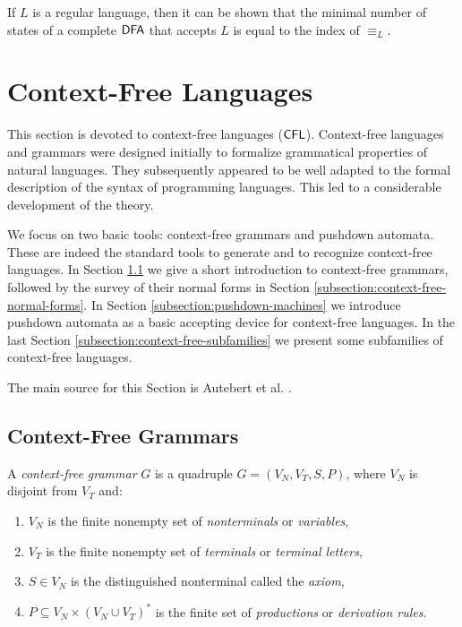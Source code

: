 If $L$ is a regular language, then it can be shown that the minimal number of states of a complete $\DFA$ that accepts $L$ is equal to the index of $\equiv_L$.

\section{Context-Free Languages}
\label{section:context-free-languages}

This section is devoted to  context-free languages \index{$\CFL$}($\CFL$). Context-free languages and  grammars were designed  initially to formalize grammatical properties of natural languages. They subsequently appeared to be well adapted to the formal description of the syntax of programming languages. This led to a considerable development of the theory.

We focus on two basic tools: context-free grammars and  pushdown automata. These are indeed the standard tools to generate and to recognize context-free languages. In Section \ref{subsection:context-free-grammars} we give a short introduction to context-free grammars, followed by the survey of their normal forms in Section \ref{subsection:context-free-normal-forms}. In Section \ref{subsection:pushdown-machines} we introduce pushdown automata as a basic accepting device for context-free languages. In the last Section \ref{subsection:context-free-subfamilies} we present some subfamilies of context-free languages.

The main source for this Section is Autebert et al. \cite{AuBeBo1997context-free}.

\subsection{Context-Free Grammars}
\label{subsection:context-free-grammars}

A \emph{context-free grammar} $G$ is a quadruple $G = (V_N, V_T, S, P)$, where $V_N$ is disjoint from $V_T$ and:

\begin{enumerate}[]
\item $V_N$ is the finite nonempty set of \emph{nonterminals} or \emph{variables},
\item $V_T$ is the finite nonempty set of \emph{terminals} or \emph{terminal letters},
\item $S \in V_N$ is the distinguished nonterminal called the \emph{axiom},
\item $P \subseteq V_N \times (V_N \cup V_T)^*$ is the finite set of \emph{productions} or \emph{derivation rules}.
\end{enumerate}

